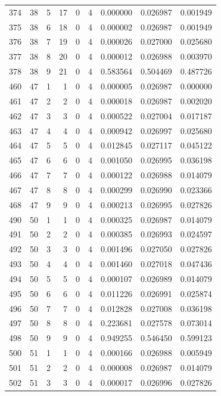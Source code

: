 \begin{longtable}{rrrrrrrrr}
374 & 38 & 5 & 17 & 0 & 4 & 0.000000 & 0.026987 & 0.001949 \\
375 & 38 & 6 & 18 & 0 & 4 & 0.000002 & 0.026987 & 0.001949 \\
376 & 38 & 7 & 19 & 0 & 4 & 0.000026 & 0.027000 & 0.025680 \\
377 & 38 & 8 & 20 & 0 & 4 & 0.000012 & 0.026988 & 0.003970 \\
378 & 38 & 9 & 21 & 0 & 4 & 0.583564 & 0.504469 & 0.487726 \\
460 & 47 & 1 & 1 & 0 & 4 & 0.000005 & 0.026987 & 0.000000 \\
461 & 47 & 2 & 2 & 0 & 4 & 0.000018 & 0.026987 & 0.002020 \\
462 & 47 & 3 & 3 & 0 & 4 & 0.000522 & 0.027004 & 0.017187 \\
463 & 47 & 4 & 4 & 0 & 4 & 0.000942 & 0.026997 & 0.025680 \\
464 & 47 & 5 & 5 & 0 & 4 & 0.012845 & 0.027117 & 0.045122 \\
465 & 47 & 6 & 6 & 0 & 4 & 0.001050 & 0.026995 & 0.036198 \\
466 & 47 & 7 & 7 & 0 & 4 & 0.000122 & 0.026988 & 0.014079 \\
467 & 47 & 8 & 8 & 0 & 4 & 0.000299 & 0.026990 & 0.023366 \\
468 & 47 & 9 & 9 & 0 & 4 & 0.000213 & 0.026995 & 0.027826 \\
490 & 50 & 1 & 1 & 0 & 4 & 0.000325 & 0.026987 & 0.014079 \\
491 & 50 & 2 & 2 & 0 & 4 & 0.000385 & 0.026993 & 0.024597 \\
492 & 50 & 3 & 3 & 0 & 4 & 0.001496 & 0.027050 & 0.027826 \\
493 & 50 & 4 & 4 & 0 & 4 & 0.001460 & 0.027018 & 0.047436 \\
494 & 50 & 5 & 5 & 0 & 4 & 0.000107 & 0.026989 & 0.014079 \\
495 & 50 & 6 & 6 & 0 & 4 & 0.011226 & 0.026991 & 0.025874 \\
496 & 50 & 7 & 7 & 0 & 4 & 0.012828 & 0.027008 & 0.036198 \\
497 & 50 & 8 & 8 & 0 & 4 & 0.223681 & 0.027578 & 0.073014 \\
498 & 50 & 9 & 9 & 0 & 4 & 0.949255 & 0.546450 & 0.599123 \\
500 & 51 & 1 & 1 & 0 & 4 & 0.000166 & 0.026988 & 0.005949 \\
501 & 51 & 2 & 2 & 0 & 4 & 0.000008 & 0.026987 & 0.014079 \\
502 & 51 & 3 & 3 & 0 & 4 & 0.000017 & 0.026996 & 0.027826 \\

\end{longtable}
